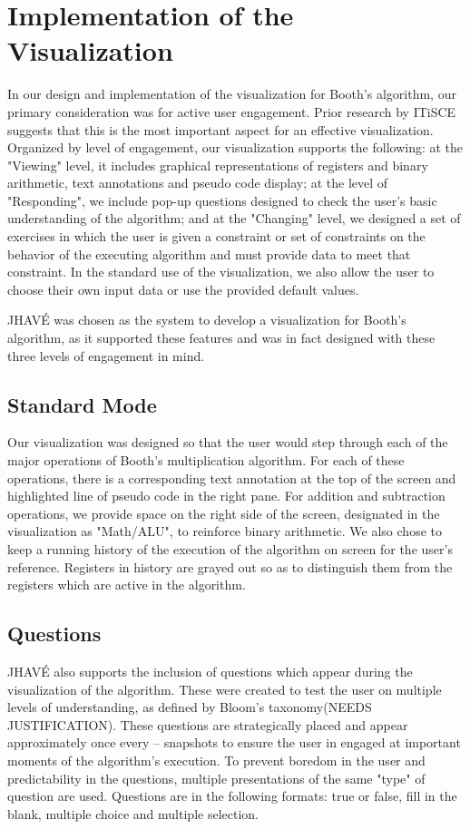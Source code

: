 \documentclass{acm_proc_article-sp}
\begin{document}
\section{Implementation of the Visualization}
In our design and implementation of the visualization for Booth's algorithm, our primary consideration was for active user engagement.
Prior research by ITiSCE suggests that this is the most important aspect for an effective visualization.\cite{tnaps:visengage}
Organized by level of engagement, our visualization supports the following: at the "Viewing" level, it includes graphical representations of registers and binary arithmetic, text annotations and pseudo code
 display; at the level of "Responding", we include pop-up questions designed to check the user's basic understanding of the algorithm; and at the "Changing" level, we designed a set of exercises in which the user is given a constraint or set of constraints on the behavior of the executing algorithm and must provide data to meet that constraint.
In the standard use of the visualization, we also allow the user to choose their own input data or use the provided default values.

JHAVÉ was chosen as the system to develop a visualization for Booth's algorithm, as it supported these features and was in fact designed with these three levels of engagement in mind.\cite{JHAVE}

\subsection{Standard Mode}
Our visualization was designed so that the user would step through each of the major operations of Booth's multiplication algorithm.
For each of these operations, there is a corresponding text annotation at the top of the screen and highlighted line of pseudo code in the right pane.
For addition and subtraction operations, we provide space on the right side of the screen, designated in the visualization as "Math/ALU", to reinforce binary arithmetic.
We also chose to keep a running history of the execution of the algorithm on screen for the user's reference.
Registers in history are grayed out so as to distinguish them from the registers which are active in the algorithm.
\subsection{Questions}
JHAVÉ also supports the inclusion of questions which appear during the visualization of the algorithm.
These were created to test the user on multiple levels of understanding, as defined by Bloom's taxonomy(NEEDS JUSTIFICATION).
These questions are strategically placed and appear approximately once every -- snapshots to ensure the user in engaged at important moments of the algorithm's execution.
To prevent boredom in the user and predictability in the questions, multiple presentations of the same "type" of question are used.
Questions are in the following formats: true or false, fill in the blank, multiple choice and multiple selection.
\end{document}
